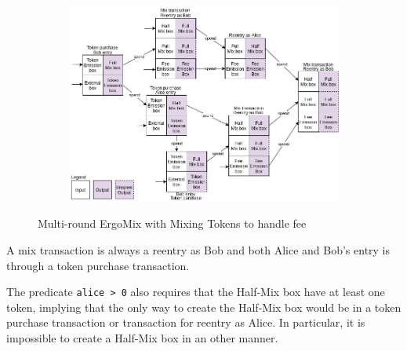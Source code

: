 \documentclass[runningheads]{llncs}
\newcommand{\mixname}{ErgoMix\xspace}
\begin{document}
\begin{figure}[h]
	\centering
	\begin{subfigure}{0.9\textwidth}
		\centering
		\includegraphics[width=\linewidth]{MixingTokens.jpg}
	\end{subfigure}
	\caption{Multi-round \mixname with Mixing Tokens to handle fee}
\label{fig:mixingtokens}
\end{figure}

A mix transaction is always a reentry as Bob and both Alice and Bob's entry is through a token purchase transaction. 

The predicate \texttt{alice > 0} also requires that the Half-Mix box have at least one token, implying that the only way to create the Half-Mix box would be in a token purchase transaction or transaction for reentry as Alice. In particular, it is impossible to create a Half-Mix box in an other manner.



\end{document}
